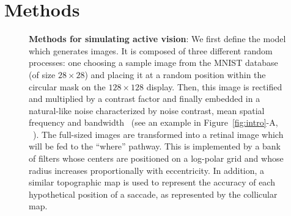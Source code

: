 \section{Methods}
\label{sec:methods}
\begin{figure}[t!]%
\ICANN
\else
{}
\fi
\caption{%
{\bf Methods for simulating active vision}:
\A We first define the model which generates images. It is composed of three different random processes: one choosing a sample image from the MNIST database (of size $28\times 28$) and placing it at a random position within the circular mask on the $128\times 128$ display. Then, this image is rectified and multiplied by a contrast factor and finally embedded in a natural-like noise characterized by noise contrast, mean spatial frequency and bandwidth~\citep{Sanz12} (see an example in  Figure~\ref{fig:intro}-A,  \DIS\ ). %
\B The full-sized images are transformed into a retinal image which will be fed to the ``where'' pathway. This is implemented by a bank of filters whose centers are positioned on a log-polar grid and whose radius increases proportionally with eccentricity. In addition, a similar topographic map is used to represent the accuracy of each hypothetical position of a saccade, as represented by the collicular map. %
}
\end{figure}
